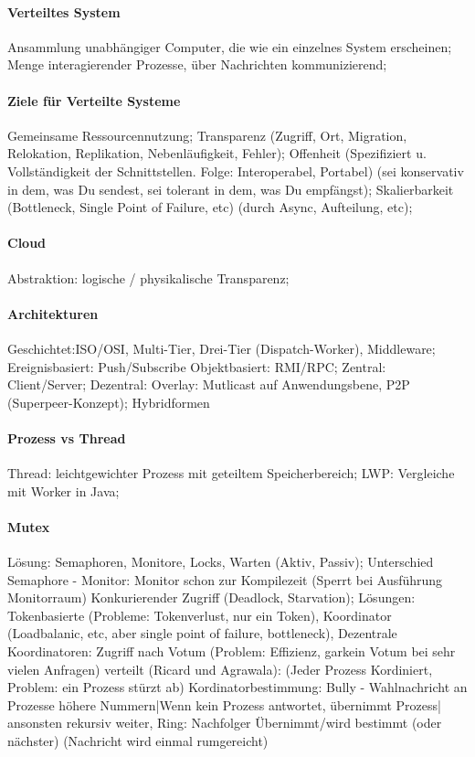 \documentclass[pagesize,11pt,a4paper]{scrartcl}
\begin{document}
\paragraph*{Verteiltes System}
	Ansammlung unabhängiger Computer, die wie ein einzelnes System erscheinen; 
	Menge interagierender Prozesse, über Nachrichten kommunizierend;

\paragraph*{Ziele für Verteilte Systeme}
	Gemeinsame Ressourcennutzung;
	Transparenz (Zugriff, Ort, Migration, Relokation, Replikation, Nebenläufigkeit, Fehler);
	Offenheit (Spezifiziert u. Vollständigkeit der Schnittstellen. Folge: Interoperabel, Portabel) (sei konservativ in dem, was Du sendest, sei tolerant in dem, was Du empfängst);
	Skalierbarkeit (Bottleneck, Single Point of Failure, etc) (durch Async, Aufteilung, etc);
	
\paragraph*{Cloud}
	Abstraktion: logische / physikalische Transparenz; 

\paragraph{Architekturen}
	Geschichtet:ISO/OSI, Multi-Tier, Drei-Tier (Dispatch-Worker), Middleware;
	Ereignisbasiert: Push/Subscribe
	Objektbasiert: RMI/RPC;
	Zentral: Client/Server;
	Dezentral: Overlay: Mutlicast auf Anwendungsbene, P2P (Superpeer-Konzept);
	Hybridformen
	
\paragraph{Prozess vs Thread}
	Thread: leichtgewichter Prozess mit geteiltem Speicherbereich;
	LWP: Vergleiche mit Worker in Java;

\paragraph*{Mutex}
	Lösung: Semaphoren, Monitore, Locks, Warten (Aktiv, Passiv);
	Unterschied Semaphore - Monitor: Monitor schon zur Kompilezeit (Sperrt bei Ausführung Monitorraum)
	Konkurierender Zugriff (Deadlock, Starvation);
	Lösungen: 
		Tokenbasierte (Probleme: Tokenverlust, nur ein Token), 
		Koordinator (Loadbalanic, etc, aber single point of failure, bottleneck),
		Dezentrale Koordinatoren: Zugriff nach Votum (Problem: Effizienz, garkein Votum bei sehr vielen Anfragen)
		verteilt (Ricard und Agrawala): (Jeder Prozess Kordiniert, Problem: ein Prozess stürzt ab)  
 		Kordinatorbestimmung: 
			Bully - Wahlnachricht an Prozesse höhere Nummern|Wenn kein Prozess antwortet, übernimmt Prozess| ansonsten rekursiv weiter,
			Ring: Nachfolger Übernimmt/wird bestimmt (oder nächster) (Nachricht wird einmal rumgereicht)
\end{document}

